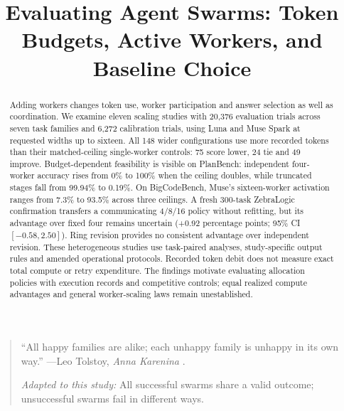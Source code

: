 \documentclass[11pt,a4paper]{article}
\title[Evaluating Agent Swarms]{Evaluating Agent Swarms: Token Budgets, Active Workers, and Baseline Choice}
\begin{document}
\maketitle

\begin{abstract}
Adding workers changes token use, worker participation and answer selection
as well as coordination. We examine eleven scaling studies with 20,376
evaluation trials across seven task families and 6,272 calibration trials,
using Luna and Muse Spark at requested widths up to sixteen. All 148 wider
configurations use more recorded tokens than their matched-ceiling
single-worker controls: 75 score lower, 24 tie and 49 improve. Budget-dependent
feasibility is visible on PlanBench: independent four-worker accuracy rises
from 0\% to 100\% when the ceiling doubles, while truncated stages fall from
99.94\% to 0.19\%. On BigCodeBench, Muse's sixteen-worker activation ranges
from 7.3\% to 93.5\% across three ceilings. A fresh 300-task ZebraLogic
confirmation transfers a communicating 4/8/16 policy without refitting, but
its advantage over fixed four remains uncertain (+0.92 percentage points;
95\% CI $[-0.58,2.50]$). Ring revision provides no consistent advantage over
independent revision. These heterogeneous studies use task-paired analyses,
study-specific output rules and amended operational protocols. Recorded
token debit does not measure exact total compute or retry expenditure.
The findings motivate evaluating allocation policies with execution records
and competitive controls; equal realized compute advantages and general
worker-scaling laws remain unestablished.
\end{abstract}

\begin{quote}
\small
``All happy families are alike; each unhappy family is unhappy in its own way.''
---Leo Tolstoy, \emph{Anna Karenina} \citep{tolstoy2014}.

\emph{Adapted to this study:} All successful swarms share a valid outcome;
unsuccessful swarms fail in different ways.
\end{quote}

\par\noindent
\begin{minipage}{\linewidth}
\captionsetup{hypcap=false}
\centering

\label{fig:worker-schedules}
\end{minipage}
\par
\end{document}
